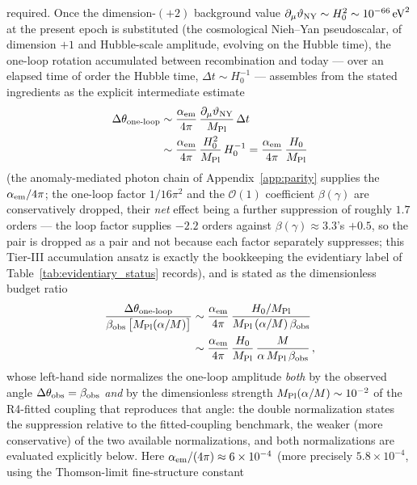\documentclass[aps,prd,twocolumn,superscriptaddress,showpacs,preprintnumbers,nofootinbib,longbibliography,floatfix]{revtex4-2}
\begin{document}
required. Once the dimension-$(+2)$ background value
$\partial_\mu\vartheta_{\rm NY} \sim H_0^2 \sim 10^{-66}\,\text{eV}^2$ at
the present epoch is substituted (the cosmological Nieh--Yan pseudoscalar,
of dimension $+1$ and Hubble-scale amplitude, evolving on the Hubble
time), the one-loop rotation accumulated between recombination and
today --- over an elapsed time of order the Hubble time,
$\Delta t\sim H_0^{-1}$ --- assembles from the stated ingredients as
the explicit intermediate estimate
\begin{align*}
\Delta\theta_{\rm one\text{-}loop}
&\sim \frac{\alpha_{\rm em}}{4\pi}\,
\frac{\partial_\mu\vartheta_{\rm NY}}{M_{\rm Pl}}\,\Delta t\\
&\sim \frac{\alpha_{\rm em}}{4\pi}\,\frac{H_0^{2}}{M_{\rm Pl}}\,
H_0^{-1}
= \frac{\alpha_{\rm em}}{4\pi}\,\frac{H_0}{M_{\rm Pl}}
\end{align*}
(the anomaly-mediated photon chain of Appendix~\ref{app:parity}
supplies the $\alpha_{\rm em}/4\pi$; the one-loop factor $1/16\pi^2$
and the $\mathcal{O}(1)$ coefficient $\beta(\gamma)$ are conservatively
dropped, their \emph{net} effect being a further suppression of roughly
$1.7$ orders --- the loop factor supplies $-2.2$ orders against
$\beta(\gamma)\approx3.3$'s $+0.5$, so the pair is dropped as a pair and
not because each factor separately suppresses; this Tier-III accumulation
ansatz is exactly the bookkeeping the
evidentiary label of Table~\ref{tab:evidentiary_status} records), and
is stated as the dimensionless budget ratio
\begin{align}\label{eq:r2_ratio}
\frac{\Delta\theta_{\rm one\text{-}loop}}{\beta_{\rm obs}\,\bigl[M_{\rm Pl}(\alpha/M)\bigr]}
&\sim \frac{\alpha_{\rm em}}{4\pi}\,\frac{H_0/M_{\rm Pl}}{M_{\rm Pl}\,(\alpha/M)\,\beta_{\rm obs}}\nonumber\\
&\sim \frac{\alpha_{\rm em}}{4\pi}\,\frac{H_0}{M_{\rm Pl}}\,\frac{M}{\alpha\,M_{\rm Pl}\,\beta_{\rm obs}}\,,
\end{align}
whose left-hand side normalizes the one-loop amplitude \emph{both} by
the observed angle $\Delta\theta_{\rm obs}=\beta_{\rm obs}$ \emph{and}
by the dimensionless strength $M_{\rm Pl}(\alpha/M)\sim10^{-2}$ of the
R4-fitted coupling that reproduces that angle: the double normalization
states the suppression relative to the fitted-coupling benchmark, the
weaker (more conservative) of the two available normalizations, and both
normalizations are evaluated explicitly below.
Here $\alpha_{\rm em}/(4\pi) \approx 6 \times 10^{-4}$ (more precisely
$5.8\times 10^{-4}$, using the Thomson-limit fine-structure constant
\end{document}
